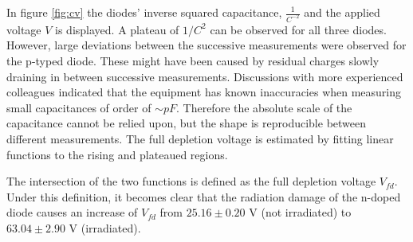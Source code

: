 \documentclass[11pt,a4paper]{report}
\begin{document}
In figure \ref{fig:cv} the diodes' inverse squared capacitance, $\frac{1}{C^{-2}}$ and the applied voltage $V$ is displayed.
A plateau of $1/C^2$ can be observed for all three diodes.
However, large deviations between the successive measurements were observed for the p-typed diode. These might have been caused by residual charges slowly draining in between successive measurements.
Discussions with more experienced colleagues indicated that the equipment has known inaccuracies when measuring small capacitances of order of $\sim pF$. Therefore the absolute scale of the capacitance cannot be relied upon, but the shape is reproducible between different measurements.
The full depletion voltage is estimated by fitting linear functions to the rising and plateaued regions. 

The intersection of the two functions is defined as the full depletion voltage $V_{fd}$.
Under this definition, it becomes clear that the radiation damage of the n-doped diode causes an increase of $V_{fd}$ from $25.16\pm0.20$ V (not irradiated) to $63.04\pm2.90$ V (irradiated).

\end{document}
